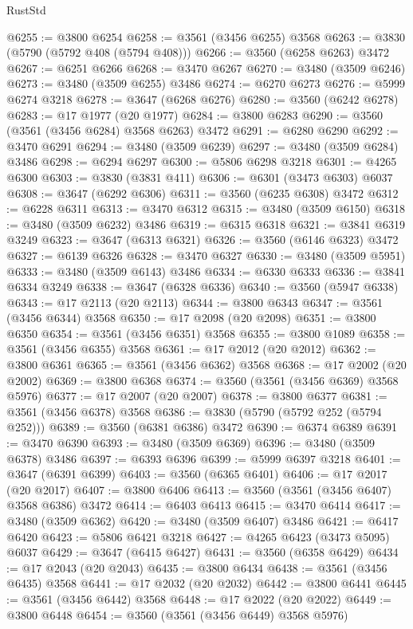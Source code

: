 \begin{lexlean}{RustStd}
\begin{coremodule}
@6255 := @3800 @6254
@6258 := @3561 (@3456 @6255) @3568
@6263 := @3830 (@5790 (@5792 @408 (@5794 @408)))
@6266 := @3560 (@6258 @6263) @3472
@6267 := @6251 @6266
@6268 := @3470 @6267
@6270 := @3480 (@3509 @6246)
@6273 := @3480 (@3509 @6255) @3486
@6274 := @6270 @6273
@6276 := @5999 @6274 @3218
@6278 := @3647 (@6268 @6276)
@6280 := @3560 (@6242 @6278)
@6283 := @17 @1977 (@20 @1977)
@6284 := @3800 @6283
@6290 := @3560 (@3561 (@3456 @6284) @3568 @6263) @3472
@6291 := @6280 @6290
@6292 := @3470 @6291
@6294 := @3480 (@3509 @6239)
@6297 := @3480 (@3509 @6284) @3486
@6298 := @6294 @6297
@6300 := @5806 @6298 @3218
@6301 := @4265 @6300
@6303 := @3830 (@3831 @411)
@6306 := @6301 (@3473 @6303) @6037
@6308 := @3647 (@6292 @6306)
@6311 := @3560 (@6235 @6308) @3472
@6312 := @6228 @6311
@6313 := @3470 @6312
@6315 := @3480 (@3509 @6150)
@6318 := @3480 (@3509 @6232) @3486
@6319 := @6315 @6318
@6321 := @3841 @6319 @3249
@6323 := @3647 (@6313 @6321)
@6326 := @3560 (@6146 @6323) @3472
@6327 := @6139 @6326
@6328 := @3470 @6327
@6330 := @3480 (@3509 @5951)
@6333 := @3480 (@3509 @6143) @3486
@6334 := @6330 @6333
@6336 := @3841 @6334 @3249
@6338 := @3647 (@6328 @6336)
@6340 := @3560 (@5947 @6338)
@6343 := @17 @2113 (@20 @2113)
@6344 := @3800 @6343
@6347 := @3561 (@3456 @6344) @3568
@6350 := @17 @2098 (@20 @2098)
@6351 := @3800 @6350
@6354 := @3561 (@3456 @6351) @3568
@6355 := @3800 @1089
@6358 := @3561 (@3456 @6355) @3568
@6361 := @17 @2012 (@20 @2012)
@6362 := @3800 @6361
@6365 := @3561 (@3456 @6362) @3568
@6368 := @17 @2002 (@20 @2002)
@6369 := @3800 @6368
@6374 := @3560 (@3561 (@3456 @6369) @3568 @5976)
@6377 := @17 @2007 (@20 @2007)
@6378 := @3800 @6377
@6381 := @3561 (@3456 @6378) @3568
@6386 := @3830 (@5790 (@5792 @252 (@5794 @252)))
@6389 := @3560 (@6381 @6386) @3472
@6390 := @6374 @6389
@6391 := @3470 @6390
@6393 := @3480 (@3509 @6369)
@6396 := @3480 (@3509 @6378) @3486
@6397 := @6393 @6396
@6399 := @5999 @6397 @3218
@6401 := @3647 (@6391 @6399)
@6403 := @3560 (@6365 @6401)
@6406 := @17 @2017 (@20 @2017)
@6407 := @3800 @6406
@6413 := @3560 (@3561 (@3456 @6407) @3568 @6386) @3472
@6414 := @6403 @6413
@6415 := @3470 @6414
@6417 := @3480 (@3509 @6362)
@6420 := @3480 (@3509 @6407) @3486
@6421 := @6417 @6420
@6423 := @5806 @6421 @3218
@6427 := @4265 @6423 (@3473 @5095) @6037
@6429 := @3647 (@6415 @6427)
@6431 := @3560 (@6358 @6429)
@6434 := @17 @2043 (@20 @2043)
@6435 := @3800 @6434
@6438 := @3561 (@3456 @6435) @3568
@6441 := @17 @2032 (@20 @2032)
@6442 := @3800 @6441
@6445 := @3561 (@3456 @6442) @3568
@6448 := @17 @2022 (@20 @2022)
@6449 := @3800 @6448
@6454 := @3560 (@3561 (@3456 @6449) @3568 @5976)

\end{coremodule}
\end{lexlean}
